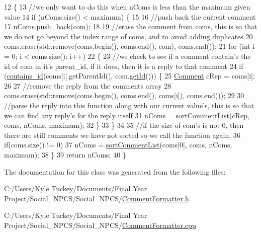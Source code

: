 \begin{DoxyCode}
12 \{
13     \textcolor{comment}{//we only want to do this when nComs is less than the maximum given value}
14     \textcolor{keywordflow}{if} (nComs.size() < maximum) \{
15 
16         \textcolor{comment}{//push back the current comment}
17         nComs.push\_back(com);
18 
19         \textcolor{comment}{//erase the comment from coms, this is so that we do not go beyond the index range of coms, and to
       avoid adding duplicates}
20         coms.erase(std::remove(coms.begin(), coms.end(), com), coms.end());
21         \textcolor{keywordflow}{for} (\textcolor{keywordtype}{int} i = 0; i < coms.size(); i++)
22         \{
23             \textcolor{comment}{//we check to see if a comment contain's the id of com in it's parent\_id, if it does, then it
       is a reply to that comment}
24             \textcolor{keywordflow}{if} (\hyperlink{class_comment_formatter_a3ee22833399687c24694b6e11a3337ba}{contains\_id}(coms[i].getParentId(), com.\hyperlink{class_comment_ab46d905afeb79abd5caa6434c84020d8}{getId}())) \{
25                 \hyperlink{class_comment}{Comment} cRep = coms[i];
26 
27                 \textcolor{comment}{//remove the reply from the comments array}
28                 coms.erase(std::remove(coms.begin(), coms.end(), coms[i]), coms.end());
29 
30                 \textcolor{comment}{//parse the reply into this function along with our current value's, this is so that we can
       find any reply's for the reply itself}
31                 nComs = \hyperlink{class_comment_formatter_a6a9af9cdde666a914d97c3f45e6c8a49}{sortCommentList}(cRep, coms, nComs, maximum);
32             \}
33         \}
34 
35         \textcolor{comment}{//if the size of com's is not 0, then there are still comments we have not sorted so we call the
       function again.}
36         \textcolor{keywordflow}{if}(coms.size() != 0)
37             nComs = \hyperlink{class_comment_formatter_a6a9af9cdde666a914d97c3f45e6c8a49}{sortCommentList}(coms[0], coms, nComs, maximum);
38     \}
39     \textcolor{keywordflow}{return} nComs;
40 \}
\end{DoxyCode}


The documentation for this class was generated from the following files\+:\begin{DoxyCompactItemize}
\item 
C\+:/\+Users/\+Kyle Tuckey/\+Documents/\+Final Year Project/\+Social\+\_\+\+N\+P\+C\+S/\+Social\+\_\+\+N\+P\+C\+S/\hyperlink{_comment_formatter_8h}{Comment\+Formatter.\+h}\item 
C\+:/\+Users/\+Kyle Tuckey/\+Documents/\+Final Year Project/\+Social\+\_\+\+N\+P\+C\+S/\+Social\+\_\+\+N\+P\+C\+S/\hyperlink{_comment_formatter_8cpp}{Comment\+Formatter.\+cpp}\end{DoxyCompactItemize}
